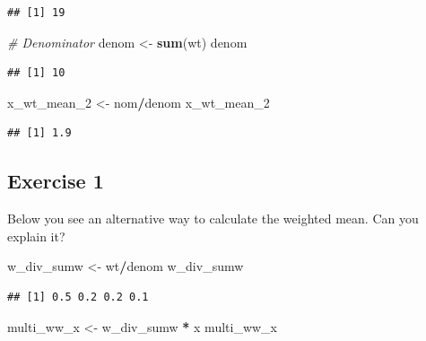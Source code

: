 \documentclass[
  doc]{apa6}
\newenvironment{Shaded}{\begin{snugshade}}{\end{snugshade}}
\newcommand{\CommentTok}[1]{\textcolor[rgb]{0.56,0.35,0.01}{\textit{#1}}}
\newcommand{\FunctionTok}[1]{\textcolor[rgb]{0.13,0.29,0.53}{\textbf{#1}}}
\newcommand{\NormalTok}[1]{#1}
\newcommand{\OtherTok}[1]{\textcolor[rgb]{0.56,0.35,0.01}{#1}}
\newcommand{\SpecialCharTok}[1]{\textcolor[rgb]{0.81,0.36,0.00}{\textbf{#1}}}
\begin{document}
\begin{verbatim}
## [1] 19
\end{verbatim}

\begin{Shaded}
\begin{Highlighting}[]
\CommentTok{\# Denominator}
\NormalTok{denom }\OtherTok{\textless{}{-}} \FunctionTok{sum}\NormalTok{(wt)}
\NormalTok{denom}
\end{Highlighting}
\end{Shaded}

\begin{verbatim}
## [1] 10
\end{verbatim}

\begin{Shaded}
\begin{Highlighting}[]
\NormalTok{x\_wt\_mean\_2 }\OtherTok{\textless{}{-}}\NormalTok{ nom}\SpecialCharTok{/}\NormalTok{denom}
\NormalTok{x\_wt\_mean\_2}
\end{Highlighting}
\end{Shaded}

\begin{verbatim}
## [1] 1.9
\end{verbatim}

\newpage

\subsection{Exercise 1}\label{exercise-1}

Below you see an alternative way to calculate the weighted mean. Can you explain it?

\begin{Shaded}
\begin{Highlighting}[]
\NormalTok{w\_div\_sumw }\OtherTok{\textless{}{-}}\NormalTok{ wt}\SpecialCharTok{/}\NormalTok{denom}
\NormalTok{w\_div\_sumw}
\end{Highlighting}
\end{Shaded}

\begin{verbatim}
## [1] 0.5 0.2 0.2 0.1
\end{verbatim}

\begin{Shaded}
\begin{Highlighting}[]
\NormalTok{multi\_ww\_x }\OtherTok{\textless{}{-}}\NormalTok{ w\_div\_sumw }\SpecialCharTok{*}\NormalTok{ x}
\NormalTok{multi\_ww\_x}
\end{Highlighting}
\end{Shaded}
\end{document}
